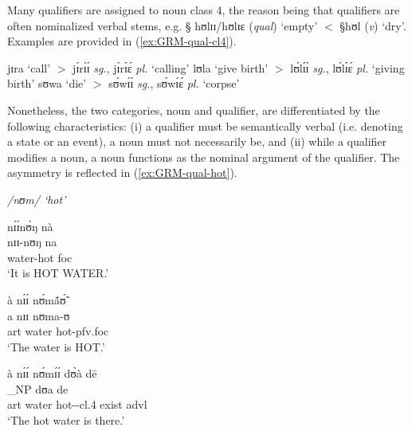 Many qualifiers are assigned to noun class 4, the
reason being that qualifiers are often nominalized verbal stems, e.g. {\S
hʊlɪɪ/hʊlɪɛ} ({\it qual}) `empty' $<$ {\S hʊl}  ({\it v})  `dry'.  Examples are
provided in  (\ref{ex:GRM-qual-cl4}).


\begin{exe}
\ex\label{ex:GRM-qual-cl4}
 \begin{xlist}
  \ex\label{ex:GRM-qual-cl4-call}
jɪra `call' $>$ jɪ́rɪ́ɪ́  {\it sg.},  jɪ́rɪ́ɛ́  {\it pl.} `calling'
\ex\label{ex:GRM-qual-cl4-give-birth}
lʊla `give birth' $>$ lʊ́lɪ́ɪ́ {\it sg.},   lʊ́lɪ́ɛ́ {\it pl.} `giving birth'
\ex\label{ex:GRM-qual-cl4-die}
sʊwa `die' $>$ sʊ́wɪ́ɪ́ {\it sg.},  sʊ́wɪ́ɛ́ {\it pl.} `corpse'

  \end{xlist}
\end{exe}



Nonetheless, the two categories, noun and qualifier, are differentiated by the
following characteristics: (i)  a qualifier must be semantically verbal (i.e. 
denoting a state or an event),
a noun must not necessarily be, and (ii) while a qualifier
modifies a noun,  a  noun functions as  the
nominal argument of the qualifier. The asymmetry is reflected in
(\ref{ex:GRM-qual-hot}).

\begin{exe}
 
 \ex\label{ex:GRM-qual-hot}{\it  /nʊm/ `hot'}
 \begin{xlist}
  \ex\label{ex:GRM-qual-hot-cmp-stem}
  \glll nɪ́ɪ́nʊ̀ŋ nà \\
 nɪɪ-nʊŋ na \\
     water-hot {\sc foc}\\
  \glt `It is HOT WATER.'

 \ex\label{ex:GRM-qual-hot-head}
  \glll  à nɪ́ɪ́ nʊ́mã́ʊ̃́\\
 a  nɪɪ nʊma-ʊ\\
      {\sc art} water hot-{\sc pfv.foc}\\
  \glt `The water is HOT.'

 \ex\label{ex:GRM-qual-hot-qual}
  \glll  à nɪ́ɪ́ nʊ́mɪ́ɪ́ dʊ̀à dē\\
 [a nɪɪ nʊm-ɪ-ɪ]_{NP} dʊa de\\
  {\sc art} water hot-{\nmlz}-{\sc cl.4} exist {\sc advl}\\
  \glt `The hot water is there.'
  \end{xlist}
\end{exe}

